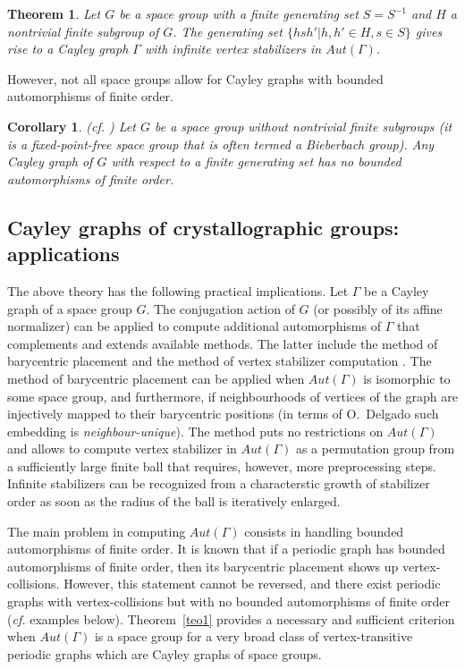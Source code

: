 \documentclass[11pt,a4paper]{article}
\newtheorem{theorem}{Theorem}
\newtheorem{corollary}{Corollary}
\begin{document}
\begin{theorem}
\label{teo2}
\emph{\cite[Lemma~6.1]{Salle19}} Let $G$ be a space group with a finite generating set $S=S^{-1}$ and $H$ a nontrivial finite subgroup of $G$. The generating set $\{hsh'|h, h' \in H, s\in S \}$ gives rise to a Cayley graph $\Gamma$ with infinite vertex stabilizers in $Aut(\Gamma)$. %
\end{theorem}

\noindent However, not all space groups allow for Cayley graphs with bounded automorphisms of finite order.

\begin{corollary}
\label{cor3}
\emph{(cf. \cite[Corollary~6.6]{Salle19})} Let $G$ be a space group without nontrivial finite subgroups (it is a fixed-point-free space group that is often termed a Bieberbach group). Any Cayley graph of $G$ with respect to a finite generating set has no bounded automorphisms of finite order.
\end{corollary}


\subsection{Cayley graphs of crystallographic groups: applications} %

The above theory has the following practical implications. Let $\Gamma$ be a Cayley graph of a space group $G$. The conjugation action of $G$ (or possibly of its affine normalizer) can be applied to compute additional automorphisms of $\Gamma$ that complements and extends available methods. The latter include the method of barycentric placement \cite{Delgado2004} and the method of vertex stabilizer computation \cite{Bab20}. The method of barycentric placement can be applied when $Aut(\Gamma)$ is isomorphic to some space group, and furthermore, if neighbourhoods of vertices of the graph are injectively mapped to their barycentric positions (in terms of O.~Delgado such embedding is \emph{neighbour-unique}). The method \cite{Bab20} puts no restrictions on $Aut(\Gamma)$ and allows to compute vertex stabilizer in $Aut(\Gamma)$ as a permutation group from a sufficiently large finite ball that requires, however, more preprocessing steps. Infinite stabilizers can be recognized from a characterstic growth of stabilizer order as soon as the radius of the ball is iteratively enlarged.

The main problem in computing $Aut(\Gamma)$ consists in handling bounded automorphisms of finite order. It is known that if a periodic graph has bounded automorphisms of finite order, then its barycentric placement shows up vertex-collisions. However, this statement cannot be reversed, and there exist periodic graphs with vertex-collisions but with no bounded automorphisms of finite order (\emph{cf.} examples below). Theorem~\ref{teo1} provides a necessary and sufficient criterion when $Aut(\Gamma)$ is a space group for a very broad class of vertex-transitive periodic graphs which are Cayley graphs of space groups. 
\end{document}
